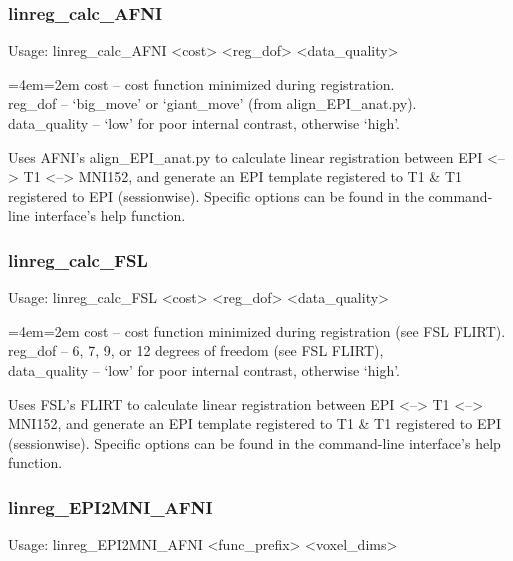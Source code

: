 \documentclass[final,titlepage,letterpaper,oneside,12pt]{article}
\renewcommand{\texttt}[2][BrickRed]{\textcolor{#1}{\ttfamily #2}}%
\newenvironment{blockquote}{%
  \par%
  \medskip
  \leftskip=4em\rightskip=2em%
  \noindent\ignorespaces}{%
  \par\medskip}
\begin{document}
\subsubsection{linreg\_calc\_AFNI}
Usage: \texttt{linreg\_calc\_AFNI <cost> <reg\_dof> <data\_quality>}

\begin{blockquote}
cost -- cost function minimized during registration. \\
reg\_dof -- `big\_move' or `giant\_move' (from align\_EPI\_anat.py). \\
data\_quality -- `low' for poor internal contrast, otherwise `high'. \
\end{blockquote}

\noindent Uses AFNI's align\_EPI\_anat.py to calculate linear registration between EPI <--> T1 <--> MNI152, and generate an EPI template registered to T1 \& T1 registered to EPI (sessionwise). Specific options can be found in the command-line interface's help function.

\subsubsection{linreg\_calc\_FSL}
Usage: \texttt{linreg\_calc\_FSL <cost> <reg\_dof> <data\_quality>}

\begin{blockquote}
cost -- cost function minimized during registration (see FSL FLIRT). \\
reg\_dof -- 6, 7, 9, or 12 degrees of freedom (see FSL FLIRT), \\
data\_quality -- `low' for poor internal contrast, otherwise `high'. \
\end{blockquote}

\noindent Uses FSL's FLIRT to calculate linear registration between EPI <--> T1 <--> MNI152, and generate an EPI template registered to T1 \& T1 registered to EPI (sessionwise). Specific options can be found in the command-line interface's help function.

\subsubsection{linreg\_EPI2MNI\_AFNI}
Usage: \texttt{linreg\_EPI2MNI\_AFNI <func\_prefix> <voxel\_dims>}
\end{document}
